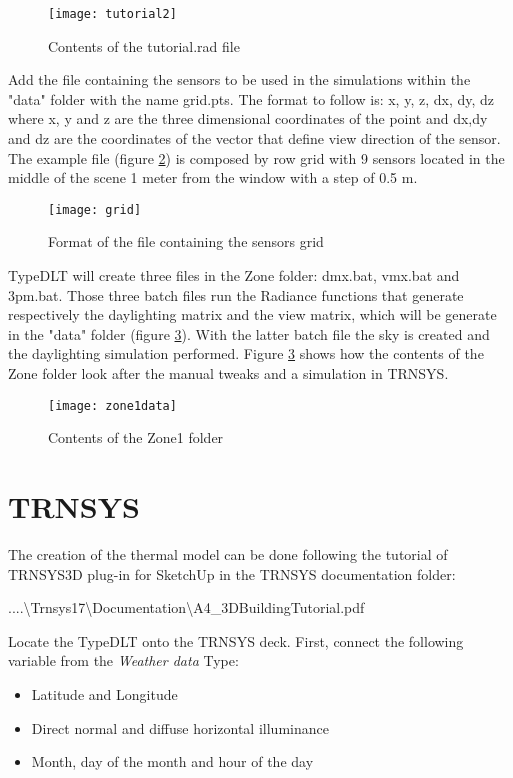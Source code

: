 \begin{figure}[h]
\centering
\texttt{[image: tutorial2]}
\caption{\label{img4:tutorial2} Contents of the tutorial.rad file}
\end{figure}

Add the file containing the sensors to be used in the simulations within the "data" folder with the name {\color{blue}grid.pts}. The format to follow is: x, y, z, dx, dy, dz where x, y and z are the three dimensional coordinates of the point and dx,dy and dz are the coordinates of the vector that define view direction of the sensor.
The example file (figure \ref{img4:grid}) is composed by row grid with 9 sensors located in the middle of the scene 1 meter from the window with a step of 0.5 m.

\begin{figure}[H]
\centering
\texttt{[image: grid]}
\caption{\label{img4:grid} Format of the file containing the sensors grid}
\end{figure}


TypeDLT will create three files in the Zone folder: dmx.bat, vmx.bat and 3pm.bat. Those three batch files run the Radiance functions that generate respectively the daylighting matrix and the view matrix, which will be generate in the "data" folder (figure \ref{img4:zone1data}). With the latter batch file the sky is created and the daylighting simulation performed. Figure \ref{img4:zone1data} shows how the contents of the Zone folder look after the manual tweaks and a simulation in TRNSYS.


\begin{figure}[h]
\centering
\texttt{[image: zone1data]}
\caption{\label{img4:zone1data} Contents of the Zone1 folder}
\end{figure}



\section{TRNSYS}
The creation of the thermal model can be done following the tutorial of TRNSYS3D plug-in for SketchUp in the TRNSYS documentation folder:
\begin{center}
....\textbackslash Trnsys17\textbackslash Documentation\textbackslash A4\_3DBuildingTutorial.pdf
\end{center} 

Locate the TypeDLT onto the TRNSYS deck. First, connect the following variable from the \textit{Weather data} Type: 
\begin{itemize}
\renewcommand{\labelitemi}{\tiny$\blacksquare$}
\item Latitude and Longitude 
\item Direct normal and diffuse horizontal illuminance
\item Month, day of the month and hour of the day
\end{itemize} 

